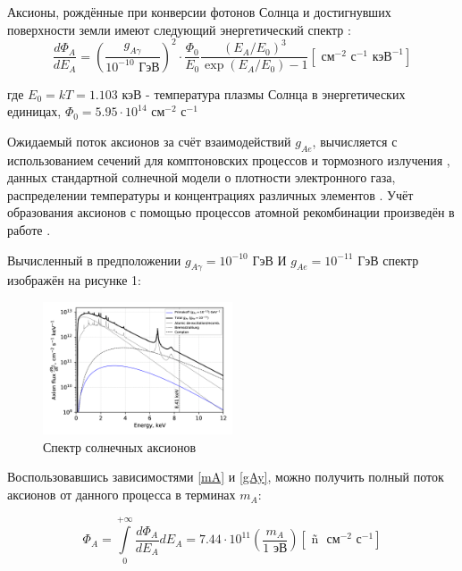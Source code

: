 \documentclass[a4paper,article,14pt]{extarticle}
\begin{document}
Аксионы, рождённые при конверсии фотонов Солнца и достигнувших поверхности земли имеют следующий энергетический спектр \cite{solarflux1, solarflux2, solarflux3}:
\begin{equation}
\frac{{d{\Phi _A}}}{{d{E_A}}} = {\left( {\frac{{{g_{A\gamma }}}}{{{{{10}^{ - 10}}} \text{ ГэВ}}}} \right)^2} \cdot \frac{{{\Phi _0}}}{{{E_0}}}\frac{{{{\left( {{E_A}/{E_0}} \right)}^3}}}{{\exp \left( {{E_A}/{E_0}} \right) - 1}} \left[ \text{ см} ^{-2} \text{ с} ^{-1} \text{ кэВ} ^{-1} \right]
\end{equation}

где ${E_0} = kT = 1.103 \text{ кэВ}$ - температура плазмы Солнца в энергетических единицах, ${{\Phi _0}} = 5.95 \cdot 10^{14} \text{ см} ^{-2} \text{ с} ^{-1}$

Ожидаемый поток аксионов за счёт взаимодействий $g_{Ae}$, вычисляется с использованием сечений для комптоновских процессов \cite{pospelov2008bosonic,gondolo2009solar} и тормозного излучения \cite{brem}, данных стандартной солнечной модели о плотности электронного газа, распределении температуры и концентрациях различных элементов \cite{kekez2009search,derbin2011constraints}. Учёт образования аксионов с помощью процессов атомной рекомбинации произведён в работе \cite{redondo2013solar}.

Вычисленный в предположении $g_{A\gamma } = {10}^{ - 10} \text{ ГэВ}$ И $g_{Ae } = {10}^{ - 11} \text{ ГэВ}$ спектр изображён на рисунке 1:

\begin{figure}
    \centering
    \includegraphics[width = 0.5\textwidth]{images/flux_solar.png}
    \caption{Спектр солнечных аксионов}
    \label{flux}
\end{figure}

Воспользовавшись зависимостями \eqref{mA} и \eqref{gAy}, можно получить полный поток аксионов от данного процесса в терминах $m_A$:

\begin{equation}
 {\Phi _A} = \int\limits_0^{ + \infty } {\frac{{d{\Phi _A}}}{{d{E_A}}}d{E_A} } = 7.44 \cdot {10^{11}}\left( {\frac{{{m_A}}}{{1{\text{ эВ}}}}} \right)\left[ {{\text{ \~n }}{{\text{ см}}^{ - 2}}{{\text{ с}}^{ - 1}}} \right]
\end{equation}
\end{document}
